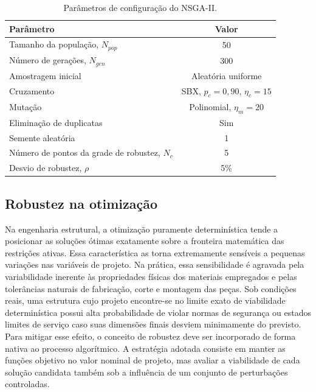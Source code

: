 \begin{table}[!ht]
\caption{Parâmetros de configuração do NSGA-II.\label{tab:nsga2}}
\begin{tabular*}{\columnwidth}{@{\extracolsep\fill}lc@{\extracolsep\fill}}
\toprule
Parâmetro & Valor \\
\midrule
Tamanho da população, $N_{pop}$ & 50 \\
Número de gerações, $N_{gen}$ & 300 \\
Amostragem inicial & Aleatória uniforme \\
Cruzamento & SBX, $p_c = 0{,}90$, $\eta_c = 15$ \\
Mutação & Polinomial, $\eta_m = 20$ \\
Eliminação de duplicatas & Sim \\
Semente aleatória & 1 \\
Número de pontos da grade de robustez, $N_c$ & 5 \\
Desvio de robustez, $\rho$ & 5\% \\
\bottomrule
\end{tabular*}
\end{table}
 
 \subsection{Robustez na otimização}\label{sec:robustez}
 
Na engenharia estrutural, a otimização puramente determinística tende a posicionar as soluções ótimas exatamente sobre a fronteira matemática das restrições ativas.
Essa característica as torna extremamente sensíveis a pequenas variações nas variáveis de projeto.
Na prática, essa sensibilidade é agravada pela variabilidade inerente às propriedades físicas dos materiais empregados e pelas tolerâncias naturais de fabricação, corte e montagem das peças.
Sob condições reais, uma estrutura cujo projeto encontre-se no limite exato de viabilidade determinística possui alta probabilidade de violar normas de segurança ou estados limites de serviço caso suas dimensões finais desviem minimamente do previsto.
Para mitigar esse efeito, o conceito de robustez deve ser incorporado de forma nativa ao processo algorítmico.
A estratégia adotada consiste em manter as funções objetivo no valor nominal de projeto, mas avaliar a viabilidade de cada solução candidata também sob a influência de um conjunto de perturbações controladas.

